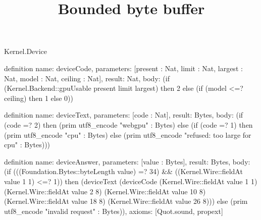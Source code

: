 \begin{lexlean}{Kernel.Device}
\title{Bounded byte buffer}
\begin{semanticmodule}
definition{
  name: deviceCode,
  parameters: [present : Nat, limit : Nat, largest : Nat, model : Nat, ceiling : Nat],
  result: Nat,
  body: (if (Kernel.Backend::gpuUsable present limit largest) then 2 else (if (model <=? ceiling) then 1 else 0))
}

definition{
  name: deviceText,
  parameters: [code : Nat],
  result: Bytes,
  body: (if (code =? 2) then (prim utf8_encode "webgpu" : Bytes) else (if (code =? 1) then (prim utf8_encode "cpu" : Bytes) else (prim utf8_encode "refused: too large for cpu" : Bytes)))
}

definition{
  name: deviceAnswer,
  parameters: [value : Bytes],
  result: Bytes,
  body: (if (((Foundation.Bytes::byteLength value) =? 34) && ((Kernel.Wire::fieldAt value 1 1) <=? 1)) then (deviceText (deviceCode (Kernel.Wire::fieldAt value 1 1) (Kernel.Wire::fieldAt value 2 8) (Kernel.Wire::fieldAt value 10 8) (Kernel.Wire::fieldAt value 18 8) (Kernel.Wire::fieldAt value 26 8))) else (prim utf8_encode "invalid request" : Bytes)),
  axioms: [Quot.sound, propext]
}
\end{semanticmodule}
\end{lexlean}

